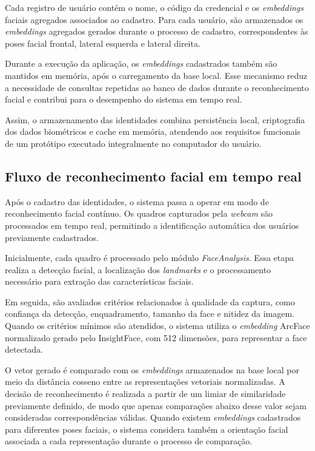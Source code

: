 Cada registro de usuário contém o nome, o código da credencial e os \textit{embeddings} faciais agregados associados ao cadastro. Para cada usuário, são armazenados os \textit{embeddings} agregados gerados durante o processo de cadastro, correspondentes às poses facial frontal, lateral esquerda e lateral direita.


Durante a execução da aplicação, os \textit{embeddings} cadastrados também são mantidos em memória, após o carregamento da base local. Esse mecanismo reduz a necessidade de consultas repetidas ao banco de dados durante o reconhecimento facial e contribui para o desempenho do sistema em tempo real.

Assim, o armazenamento das identidades combina persistência local, criptografia dos dados biométricos e cache em memória, atendendo aos requisitos funcionais de um protótipo executado integralmente no computador do usuário.

\subsection{Fluxo de reconhecimento facial em tempo real}

Após o cadastro das identidades, o sistema passa a operar em modo de reconhecimento facial contínuo. Os quadros capturados pela \textit{webcam} são processados em tempo real, permitindo a identificação automática dos usuários previamente cadastrados.

Inicialmente, cada quadro é processado pelo módulo \textit{FaceAnalysis}. Essa etapa realiza a detecção facial, a localização dos \textit{landmarks} e o processamento necessário para extração das características faciais.

Em seguida, são avaliados critérios relacionados à qualidade da captura, como confiança da detecção, enquadramento, tamanho da face e nitidez da imagem. Quando os critérios mínimos são atendidos, o sistema utiliza o \textit{embedding} ArcFace normalizado gerado pelo InsightFace, com 512 dimensões, para representar a face detectada.

O vetor gerado é comparado com os \textit{embeddings} armazenados na base local por meio da distância cosseno entre as representações vetoriais normalizadas. A decisão de reconhecimento é realizada a partir de um limiar de similaridade previamente definido, de modo que apenas comparações abaixo desse valor sejam consideradas correspondências válidas. Quando existem \textit{embeddings} cadastrados para diferentes poses faciais, o sistema considera também a orientação facial associada a cada representação durante o processo de comparação.

